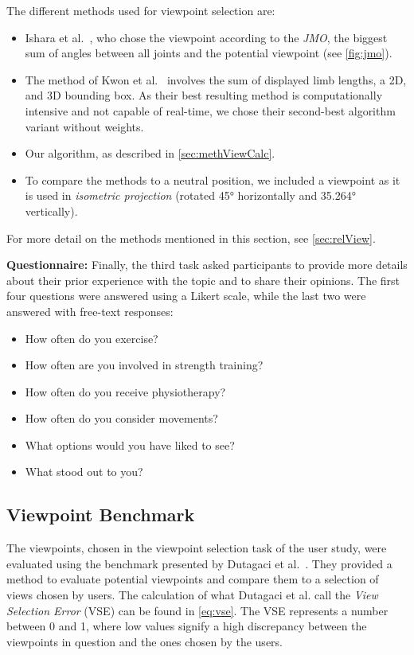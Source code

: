The different methods used for viewpoint selection are:
\begin{itemize}
	\setlength{\itemsep}{-0.3cm}
	\item Ishara et al.~\cite{ishara2015mra}, who chose the viewpoint according to the \emph{JMO}, the biggest sum of angles between all joints and the potential viewpoint (see \autoref{fig:jmo}).
	\item The method of Kwon et al.~\cite{kwon2020ocp} involves the sum of displayed limb lengths, a 2D, and 3D bounding box. As their best resulting method is computationally intensive and not capable of real-time, we chose their second-best algorithm variant without weights.
	\item Our algorithm, as described in \autoref{sec:methViewCalc}.
	\item  To compare the methods to a neutral position, we included a viewpoint as it is used in \emph{isometric projection} (rotated 45° horizontally and 35.264° vertically).
\end{itemize}
For more detail on the methods mentioned in this section, see \autoref{sec:relView}.

\textbf{Questionnaire:} Finally, the third task asked participants to provide more details about their prior experience with the topic and to share their opinions. The first four questions were answered using a Likert scale, while the last two were answered with free-text responses:

\begin{itemize}
	\setlength{\itemsep}{-0.3cm}
	\item How often do you exercise?
	\item How often are you involved in strength training?
	\item How often do you receive physiotherapy? 
	\item How often do you consider movements?
	\item What options would you have liked to see?
	\item What stood out to you?
\end{itemize} 

\subsection{Viewpoint Benchmark \label{sec:benchmark}}
The viewpoints, chosen in the viewpoint selection task of the user study, were evaluated using the benchmark presented by Dutagaci et al.~\cite{dutagaci2010bbv}. They provided a method to evaluate potential viewpoints and compare them to a selection of views chosen by users. The calculation of what Dutagaci et al. call the \emph{View Selection Error} (VSE) can be found in \autoref{eq:vse}. The VSE represents a number between 0 and 1, where low values signify a high discrepancy between the viewpoints in question and the ones chosen by the users.

